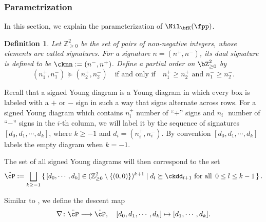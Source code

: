 \documentclass[12pt,a4paper]{amsart}
\newcommand{\Z}{\mathbb{Z}}
\def\DD{\nabla}
\numberwithin{equation}{section}
\newtheorem{defn}[thm]{Definition}
\theoremstyle{remark}
\def\lsign{{}^l\mathrm{Sign}}
\def\ssP{{\ddot\cP}}
\begin{document}
\subsubsection{Parametrization}
 In this section, we explain the parameterization
of $\Nil_{\bfK}(\fpp)$.

\begin{defn}\label{def:dec.rP} Let $\Z_{\geq 0}^2$ be the set of pairs of
  non-negative integers, whose elements are called \emph{signatures}.
  For a signature $n = (n^+,n^-)$, its \emph{dual signature} is defined to be
  $\cknn:=(n^-, n^+)$.
  Define a partial order on $\bZ_{\geq 0}^2$ by
\[
  (n^+_1,n^-_1)\succeq (n^+_2,n^-_2)\quad \text{if and only if}\quad n^+_1\geq
  n^+_2 \text{ and } n^-_1\geq n^-_2.
\]
\end{defn}

Recall that a signed Young diagram is a Young diagram in which every box is labeled with a $+$ or $-$ sign in such a way that signs alternate across rows.
For a signed Young diagram which contains $n^+_i$ number of ``$+$'' signs and $n^-_i$ number of ``$-$'' signs in the $i$-th column, we will label it by the sequence
of signatures $[d_0,d_1,\cdots, d_k]$, where $k\geq -1$ and
$d_i = (n^+_i, n^-_i)$. By convention $[d_0,d_1,\cdots, d_k]$ labels the empty
diagram when $k=-1$.

The set of all signed Young diagrams will then correspond to the set
\[
  \ssP:=\bigsqcup_{k\geq -1} \set{[d_0,\cdots, d_k]\in ( \Z_{\geq
      0}^2\setminus\{(0,0)\})^{k+1}\mid d_l\succeq \ckdd_{l+1}
    \textrm{ for all }\, 0\leq l\leq k-1}.
\]

Similar to , we define the descent map
\begin{equation}\label{dedd}
  \DD \colon \ssP \longrightarrow \ssP,
  \quad [d_0, d_{1}, \cdots, d_k]\mapsto [d_{1},\cdots, d_k].
\end{equation}



\end{document}
